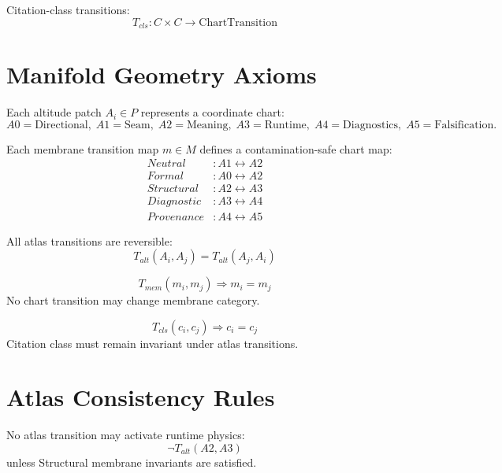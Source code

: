 \documentclass[11pt]{article}
\begin{document}
Citation-class transitions:
\[
T_{cls} : C \times C \rightarrow \text{ChartTransition}
\]

\section{Manifold Geometry Axioms}

\begin{axiom}
Each altitude patch $A_i \in P$ represents a coordinate chart:
\[
A0 = \text{Directional},\;
A1 = \text{Seam},\;
A2 = \text{Meaning},\;
A3 = \text{Runtime},\;
A4 = \text{Diagnostics},\;
A5 = \text{Falsification}.
\]
\end{axiom}

\begin{axiom}
Each membrane transition map $m \in M$ defines a contamination-safe chart map:
\[
\begin{aligned}
Neutral &: A1 \leftrightarrow A2 \\
Formal &: A0 \leftrightarrow A2 \\
Structural &: A2 \leftrightarrow A3 \\
Diagnostic &: A3 \leftrightarrow A4 \\
Provenance &: A4 \leftrightarrow A5
\end{aligned}
\]
\end{axiom}

\begin{axiom}
All atlas transitions are reversible:
\[
T_{alt}(A_i, A_j) = T_{alt}(A_j, A_i)
\]
\end{axiom}

\begin{axiom}
\[
T_{mem}(m_i, m_j) \Rightarrow m_i = m_j
\]
No chart transition may change membrane category.
\end{axiom}

\begin{axiom}
\[
T_{cls}(c_i, c_j) \Rightarrow c_i = c_j
\]
Citation class must remain invariant under atlas transitions.
\end{axiom}

\section{Atlas Consistency Rules}

\begin{axiom}
No atlas transition may activate runtime physics:
\[
\neg T_{alt}(A2, A3)
\]
unless Structural membrane invariants are satisfied.
\end{axiom}
\end{document}

